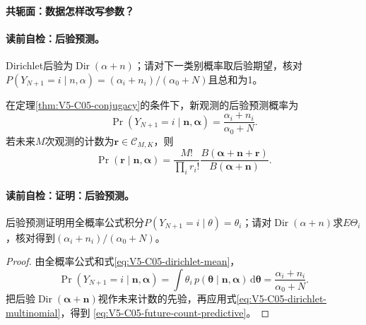 \paragraph{共轭面：数据怎样改写参数？}


\paragraph{读前自检：后验预测。}Dirichlet后验为$\operatorname{Dir}(\alpha+n)$；请对下一类别概率取后验期望，核对$P(Y_{N+1}=i\mid n,\alpha)=(\alpha_i+n_i)/(\alpha_0+N)$且总和为1。\par

\begin{proposition}[后验预测]\label{prop:V5-C05-predictive}
在定理\ref{thm:V5-C05-conjugacy}的条件下，新观测的后验预测概率为
\begin{equation}\label{eq:V5-C05-one-step-predictive}
\Pr(Y_{N+1}=i\mid\boldsymbol n,\boldsymbol\alpha)
=\frac{\alpha_i+n_i}{\alpha_0+N}.
\end{equation}
若未来$M$次观测的计数为$\boldsymbol r\in\mathcal C_{M,K}$，则
\begin{equation}\label{eq:V5-C05-future-count-predictive}
\Pr(\boldsymbol r\mid\boldsymbol n,\boldsymbol\alpha)
=\frac{M!}{\prod_i r_i!}
\frac{B(\boldsymbol\alpha+\boldsymbol n+\boldsymbol r)}
{B(\boldsymbol\alpha+\boldsymbol n)}.
\end{equation}
\end{proposition}
\paragraph{读前自检：证明：后验预测。}后验预测证明用全概率公式积分$P(Y_{N+1}=i\mid\theta)=\theta_i$；请对$\operatorname{Dir}(\alpha+n)$求$E\Theta_i$，核对得到$(\alpha_i+n_i)/(\alpha_0+N)$。\par

\begin{proof}
由全概率公式和式\eqref{eq:V5-C05-dirichlet-mean}，
\[
\Pr(Y_{N+1}=i\mid\boldsymbol n,\boldsymbol\alpha)
=\int\theta_i\,
p(\boldsymbol\theta\mid\boldsymbol n,\boldsymbol\alpha)
\,\mathrm d\boldsymbol\theta
=\frac{\alpha_i+n_i}{\alpha_0+N}.
\]
把后验$\operatorname{Dir}(\boldsymbol\alpha+\boldsymbol n)$视作未来计数的先验，再应用式\eqref{eq:V5-C05-dirichlet-multinomial}，得到
\eqref{eq:V5-C05-future-count-predictive}。
\end{proof}

